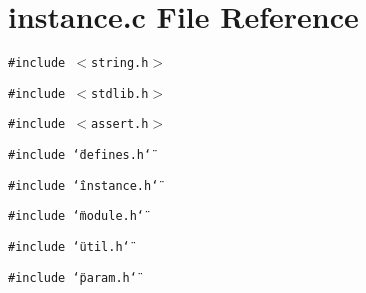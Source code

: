 \section{instance.c File Reference}
\label{instance_8c}
{\tt \#include $<$string.h$>$}\par
{\tt \#include $<$stdlib.h$>$}\par
{\tt \#include $<$assert.h$>$}\par
{\tt \#include \char`\"{}defines.h\char`\"{}}\par
{\tt \#include \char`\"{}instance.h\char`\"{}}\par
{\tt \#include \char`\"{}module.h\char`\"{}}\par
{\tt \#include \char`\"{}util.h\char`\"{}}\par
{\tt \#include \char`\"{}param.h\char`\"{}}\par
